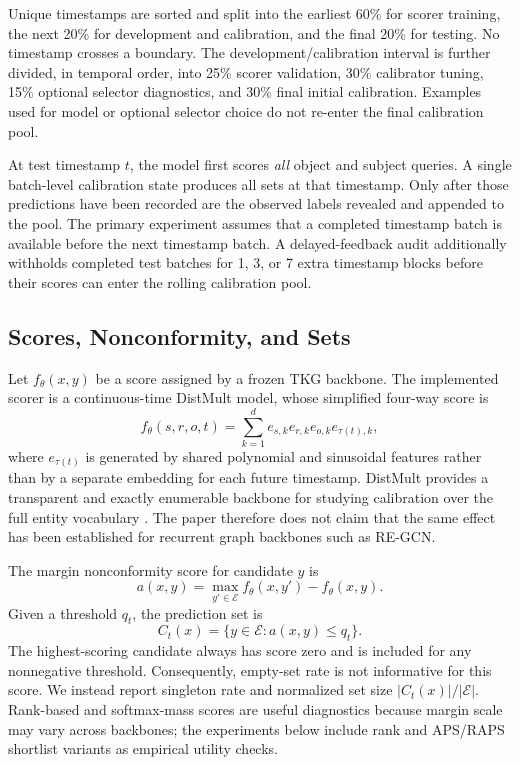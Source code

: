 \documentclass[information,article,submit,oneauthor,pdftex]{Definitions/mdpi}
\begin{document}
Unique timestamps are sorted and split into the earliest 60\% for scorer
training, the next 20\% for development and calibration, and the final 20\% for
testing. No timestamp crosses a boundary. The development/calibration interval
is further divided, in temporal order, into 25\% scorer validation, 30\%
calibrator tuning, 15\% optional selector diagnostics, and 30\% final initial
calibration. Examples used for model or optional selector choice do not re-enter
the final calibration pool.

At test timestamp \(t\), the model first scores \emph{all} object and subject
queries. A single batch-level calibration state produces all sets at that
timestamp. Only after those predictions have been recorded are the observed
labels revealed and appended to the pool. The primary experiment assumes that a
completed timestamp batch is available before the next timestamp batch. A
delayed-feedback audit additionally withholds completed test batches for
1, 3, or 7 extra timestamp blocks before their scores can enter the rolling
calibration pool.

\subsection{Scores, Nonconformity, and Sets}

Let \(f_\theta(x,y)\) be a score assigned by a frozen TKG backbone. The
implemented scorer is a continuous-time DistMult model, whose simplified
four-way score is
\[
  f_\theta(s,r,o,t)=\sum_{k=1}^{d}
  e_{s,k}e_{r,k}e_{o,k}e_{\tau(t),k},
\]
where \(e_{\tau(t)}\) is generated by shared polynomial and sinusoidal features
rather than by a separate embedding for each future timestamp. DistMult
provides a transparent and exactly enumerable backbone for studying calibration
over the full entity vocabulary \cite{yang2015distmult}. The paper therefore
does not claim that the same effect has been established for recurrent graph
backbones such as RE-GCN.

The margin nonconformity score for candidate \(y\) is
\[
  a(x,y)=\max_{y'\in\mathcal{E}}f_\theta(x,y')-f_\theta(x,y).
\]
Given a threshold \(q_t\), the prediction set is
\[
  C_t(x)=\{y\in\mathcal{E}:a(x,y)\leq q_t\}.
\]
The highest-scoring candidate always has score zero and is included for any
nonnegative threshold. Consequently, empty-set rate is not informative for this
score. We instead report singleton rate and normalized set size
\(|C_t(x)|/|\mathcal{E}|\). Rank-based and softmax-mass scores are useful
diagnostics because margin scale may vary across backbones; the experiments
below include rank and APS/RAPS shortlist variants as empirical utility checks.
\end{document}
